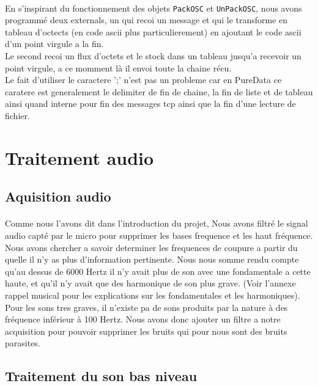 \documentclass[a4paper, titlepage, oneside, 12pt]{article}%
\begin{document}
\paragraph{}
En s'inspirant du fonctionnement des objets \texttt{PackOSC} et \texttt{UnPackOSC}, nous avons programmé deux externals, un qui recoi un message et qui le transforme en tableau d'octects (en code ascii plus particulierement) en ajoutant le code ascii d'un point virgule a la fin.\\
Le second recoi un flux d'octets et le stock dans un tableau jusqu'a recevoir un point virgule, a ce momment là il envoi toute la chaine récu.\\
Le fait d'utiliser le caractere ';' n'est pas un probleme car en PureData ce caratere est generalement le delimiter de fin de chaine, la fin de liste et de tableau ainsi quand interne pour fin des messages tcp ainsi que la fin d'une lecture de fichier.

\section{Traitement audio}
\subsection{Aquisition audio}
\paragraph{}
Comme nous l'avons dit dans l'introduction du projet, Nous avons filtré le signal audio capté par le micro pour supprimer les bases frequence et les haut fréquence.\\
Nous avons chercher a savoir determiner les frequences de coupure a partir du quelle il n'y as plus d'information pertinente. Nous nous somme rendu compte qu'au dessus de 6000 Hertz il n'y avait plus de son avec une fondamentale a cette haute, et qu'il n'y avait que des harmonique de son plus grave. (Voir l'annexe rappel musical pour les explications sur les fondamentales et les harmoniques).\\
Pour les sons tres graves, il n'existe pa de sons produits par la nature à des fréquence inférieur à 100 Hertz. Nous avons donc ajouter un filtre a notre acquisition pour pouvoir supprimer les bruits qui pour nous sont des bruits parasites.

\subsection{Traitement du son bas niveau}
\end{document}
